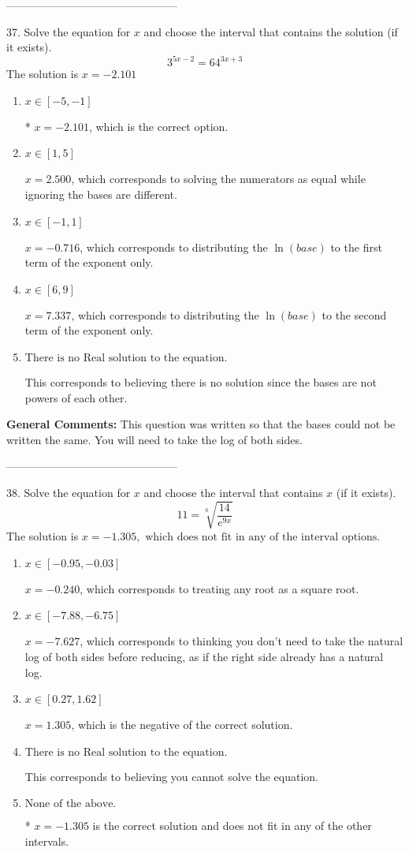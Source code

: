 \documentclass{extbook}[14pt]
\begin{document}
-----------------------------------------------

37. Solve the equation for $x$ and choose the interval that contains the solution (if it exists).
\[ 3^{5x-2} = 64^{3x+3} \] 
The solution is $ x = -2.101 $ 

\begin{enumerate}[label=\Alph*.] 
\item $ x \in [-5, -1] $ 

 * $x = -2.101$, which is the correct option. 
\item $ x \in [1, 5] $ 

 $x = 2.500$, which corresponds to solving the numerators as equal while ignoring the bases are different. 
\item $ x \in [-1, 1] $ 

 $x = -0.716$, which corresponds to distributing the $\ln(base)$ to the first term of the exponent only. 
\item $ x \in [6, 9] $ 

 $x = 7.337$, which corresponds to distributing the $\ln(base)$ to the second term of the exponent only. 
\item $ \text{There is no Real solution to the equation.} $ 

 This corresponds to believing there is no solution since the bases are not powers of each other. 
\end{enumerate} 
 
\textbf{General Comments:} This question was written so that the bases could not be written the same. You will need to take the log of both sides.

-----------------------------------------------

38.  Solve the equation for $x$ and choose the interval that contains $x$ (if it exists).
\[  11 = \sqrt[6]{\frac{14}{e^{9x}}} \] 
The solution is $ x = -1.305, \text{ which does not fit in any of the interval options.} $ 

\begin{enumerate}[label=\Alph*.] 
\item $ x \in [-0.95, -0.03] $ 

 $x = -0.240$, which corresponds to treating any root as a square root. 
\item $ x \in [-7.88, -6.75] $ 

 $x = -7.627$, which corresponds to thinking you don't need to take the natural log of both sides before reducing, as if the right side already has a natural log. 
\item $ x \in [0.27, 1.62] $ 

 $x = 1.305$, which is the negative of the correct solution. 
\item $ \text{There is no Real solution to the equation.} $ 

 This corresponds to believing you cannot solve the equation. 
\item $ \text{None of the above.} $ 

 * $x = -1.305$ is the correct solution and does not fit in any of the other intervals. 
\end{enumerate} 
 
\end{document}
